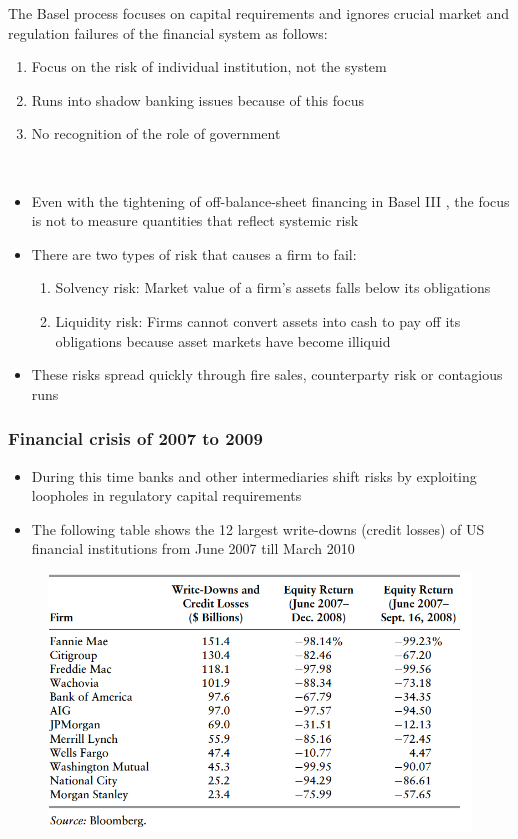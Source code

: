 \documentclass[11pt]{beamer}
\begin{document}
\begin{frame}
The Basel process focuses on capital requirements and ignores crucial market and regulation failures of the financial system as follows:
\begin{enumerate}
\item Focus on the risk of individual institution, not the system
\item Runs into shadow banking issues because of this focus
\item No recognition of the role of government
\end{enumerate}
~\\
\begin{itemize}
\item Even with the tightening of off-balance-sheet financing in Basel III , the focus is not to measure quantities that reflect systemic risk
\item There are two types of risk that causes a firm to fail:
	\begin{enumerate}
		\item Solvency risk: Market value of a firm's assets falls below its obligations
		\item Liquidity risk: Firms cannot convert assets into cash to pay off its obligations because asset markets have become illiquid
	\end{enumerate}
\item These risks spread quickly through fire sales, counterparty risk or contagious runs
\end{itemize}
\end{frame}

\begin{frame}
\frametitle{Financial crisis of 2007 to 2009}
\begin{itemize}
\item During this time banks and other intermediaries shift risks by exploiting loopholes in regulatory capital requirements
\item The following table shows the 12 largest write-downs (credit losses) of US financial institutions from June 2007 till March 2010
\end{itemize}
\end{frame}

\begin{frame}
\begin{figure}
\includegraphics[width=\textwidth]{table6_1.png}
\end{figure}
\end{frame}
\end{document}

